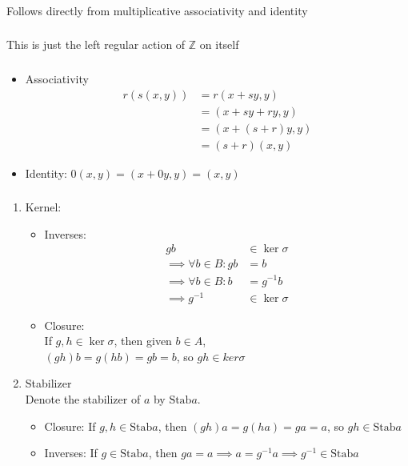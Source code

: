 \documentclass{article}
\newcommand{\ints}{\mathbb{Z}}
\newcommand{\inv}[1]{ {#1}^{-1} }
\newcommand{\Stab}{ \mbox{Stab} }
\begin{document}
\subsubsection{}\label{ex7p1}
Follows directly from multiplicative associativity and identity
\subsubsection{}\label{ex7p2}
This is just the left regular action of $\ints$ on itself
\subsubsection{}\label{ex7p3}
\begin{itemize}
\item Associativity
\begin{align*}
r(s(x,y)) &= r(x+sy,y)\\
&= (x+sy + ry, y)\\
&= (x+(s+r)y, y)\\
&= (s+r)(x,y)
\end{align*}
\item Identity: 
$0(x,y) = (x + 0y, y) = (x,y)$
\end{itemize}
\subsubsection{}\label{ex7p4}
\begin{enumerate}
	\item Kernel:
		\begin{itemize}
			\item Inverses:\\
				
				\begin{align*}
				gb &\in \ker\sigma\\
				\implies \forall b\in B: gb &= b\\
				\implies \forall b\in B: b &= \inv{g}b\\
				\implies \inv{g} &\in \ker\sigma
				\end{align*}
			\item Closure:\\
				If $g,h\in \ker\sigma$, then given $b\in A$,\\
				$(gh)b = g(hb) = gb = b$, so $gh \in ker\sigma$
		\end{itemize}
	\item Stabilizer\\
		Denote the stabilizer of $a$ by $\Stab a$.
		\begin{itemize}
				\item Closure: If $g,h \in \Stab a$, then $(gh)a=g(ha)=ga=a$, so $gh \in \Stab a$
				\item Inverses: If $g\in\Stab a$, then $ga=a \implies a=\inv{g}a\implies \inv{g} \in \Stab a$
		\end{itemize}
\end{enumerate}
\end{document}
